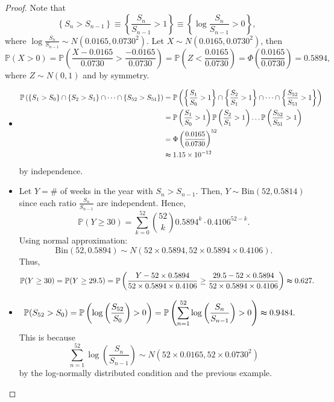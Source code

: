 \begin{proof}
    Note that 
    \[
        \left\{ S_n > S_{n-1} \right\} \equiv \left\{ \frac{S_n}{S_{n-1}} > 1 \right\} \equiv \left\{ \log \frac{S_n}{S_{n-1}} > 0 \right\},   
    \]
    where \(\log \frac{S_n}{S_{n-1}} \sim N(0.0165, 0.0730^2)\). Let \(X \sim N(0.0165, 0.0730^2)\), then 
    \[
        \mathbb{P} (X > 0) = \mathbb{P} \left( \frac{X - 0.0165}{0.0730} > \frac{-0.0165}{0.0730} \right) = \mathbb{P} (Z < \frac{0.0165}{0.0730}) = \Phi \left( \frac{0.0165}{0.0730} \right) = 0.5894, 
    \]  
    where \(Z \sim N(0, 1)\) and by symmetry. 

    \begin{itemize}
        \item [(1)] 
        \begin{align*}
            \mathbb{P} \left( \left\{ S_1 > S_0 \right\} \cap \left\{ S_2 > S_1 \right\} \cap \dots \cap \left\{ S_{52} > S_{51} \right\}    \right) &= \mathbb{P} \left( \left\{ \frac{S_1}{S_0} > 1 \right\} \cap \left\{ \frac{S_2}{S_1} > 1 \right\} \cap \dots \cap \left\{ \frac{S_{52}}{S_{51}} > 1 \right\}  \right) \\
            &= \mathbb{P} \left( \frac{S_1}{S_0} > 1 \right) \mathbb{P} \left( \frac{S_2}{S_1} > 1 \right) \dots \mathbb{P} \left( \frac{S_{52}}{S_{51}} > 1 \right) \\
            &= \Phi \left( \frac{0.0165}{0.0730} \right)^{52} \\
            &\thickapprox 1.15 \times 10^{-12}    
        \end{align*}
        by independence.
        \item [(2)] Let \(Y = \#\) of weeks in the year with \(S_n > S_{n-1}\). Then, \(Y \sim \mathrm{Bin} \left( 52, 0.5814 \right)  \) since each ratio \(\frac{S_n}{S_{n-1}}\) are independent. Hence,
        \[
            \mathbb{P} (Y \ge 30) = \sum_{k=0}^{52} \binom{52}{k} 0.5894^k \cdot 0.4106^{52 - k} .
        \]
        Using normal approximation:
        \[
            \mathrm{Bin}(52, 0.5894) \sim N(52 \times 0.5894, 52 \times 0.5894 \times 0.4106). 
        \]
        Thus,
        \begin{align*}
            \mathbb{P} (Y \ge 30) &= \mathbb{P} (Y \ge 29.5) = \mathbb{P} \left( \frac{Y - 52 \times 0.5894}{52 \times 0.5894 \times 0.4106} \ge \frac{29.5 - 52 \times 0.5894}{52 \times 0.5894 \times 0.4106}  \right) \thickapprox 0.627.
        \end{align*}
        \item [(3)] 
        \begin{align*}
            \mathbb{P} (S_{52} > S_0) &= \mathbb{P} \left( \log \left( \frac{S_{52}}{S_0} \right) > 0  \right) = \mathbb{P} \left( \sum_{n=1}^{52} \log \left( \frac{S_n}{S_{n-1}} \right)  > 0 \right) \thickapprox 0.9484.  
        \end{align*}
        This is because 
        \[
           \sum_{n=1}^{52} \log \left( \frac{S_n}{S_{n-1}} \right) \sim N(52 \times 0.0165, 52 \times 0.0730^2) 
        \]
        by the log-normally distributed condition and the previous example.
    \end{itemize}  
\end{proof}